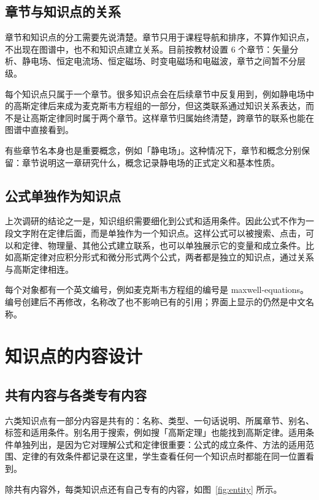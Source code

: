 \documentclass[UTF8,a4paper,zihao=-4]{ctexart}
\begin{document}
\subsection{章节与知识点的关系}

章节和知识点的分工需要先说清楚。章节只用于课程导航和排序，不算作知识点，不出现在图谱中，也不和知识点建立关系。目前按教材设置 6 个章节：矢量分析、静电场、恒定电流场、恒定磁场、时变电磁场和电磁波，章节之间暂不分层级。

每个知识点只属于一个章节。很多知识点会在后续章节中反复用到，例如静电场中的高斯定律后来成为麦克斯韦方程组的一部分，但这类联系通过知识关系表达，而不是让高斯定律同时属于两个章节。这样章节归属始终清楚，跨章节的联系也能在图谱中直接看到。

有些章节名本身也是重要概念，例如「静电场」。这种情况下，章节和概念分别保留：章节说明这一章研究什么，概念记录静电场的正式定义和基本性质。

\subsection{公式单独作为知识点}

上次调研的结论之一是，知识组织需要细化到公式和适用条件。因此公式不作为一段文字附在定律后面，而是单独作为一个知识点。这样公式可以被搜索、点击，可以和定律、物理量、其他公式建立联系，也可以单独展示它的变量和成立条件。比如高斯定律对应积分形式和微分形式两个公式，两者都是独立的知识点，通过关系与高斯定律相连。

每个对象都有一个英文编号，例如麦克斯韦方程组的编号是 maxwell-equations。编号创建后不再修改，名称改了也不影响已有的引用；界面上显示的仍然是中文名称。

\section{知识点的内容设计}

\subsection{共有内容与各类专有内容}

六类知识点有一部分内容是共有的：名称、类型、一句话说明、所属章节、别名、标签和适用条件。别名用于搜索，例如搜「高斯定理」也能找到高斯定律。适用条件单独列出，是因为它对理解公式和定律很重要：公式的成立条件、方法的适用范围、定律的有效条件都记录在这里，学生查看任何一个知识点时都能在同一位置看到。

除共有内容外，每类知识点还有自己专有的内容，如图~\ref{fig:entity} 所示。
\end{document}
